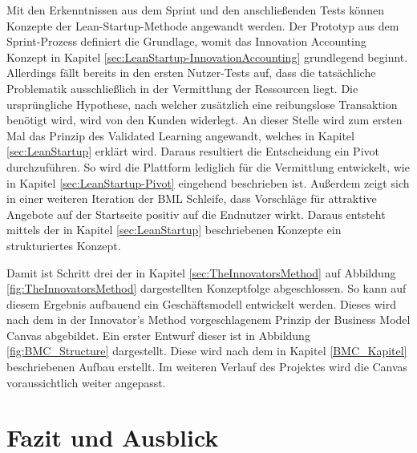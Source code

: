 Mit den Erkenntnissen aus dem Sprint und den anschließenden Tests können Konzepte der Lean-Startup-Methode angewandt werden. Der Prototyp aus dem Sprint-Prozess definiert die Grundlage, womit das Innovation Accounting Konzept in Kapitel \ref{sec:LeanStartup-InnovationAccounting} grundlegend beginnt. Allerdings fällt bereits in den ersten Nutzer-Tests auf, dass die tatsächliche Problematik ausschließlich in der Vermittlung der Ressourcen liegt. Die ursprüngliche Hypothese, nach welcher zusätzlich eine reibungslose Transaktion benötigt wird, wird von den Kunden widerlegt. An dieser Stelle wird zum ersten Mal das Prinzip des Validated Learning angewandt, welches in Kapitel \ref{sec:LeanStartup} erklärt wird. Daraus resultiert die Entscheidung ein Pivot durchzuführen. So wird die Plattform lediglich für die Vermittlung entwickelt, wie in Kapitel \ref{sec:LeanStartup-Pivot} eingehend beschrieben ist. Außerdem zeigt sich in einer weiteren Iteration der \ac{BML} Schleife, dass Vorschläge für attraktive Angebote auf der Startseite positiv auf die Endnutzer wirkt. Daraus entsteht mittels der in Kapitel \ref{sec:LeanStartup} beschriebenen Konzepte ein strukturiertes Konzept. 

Damit ist Schritt drei der in Kapitel \ref{sec:TheInnovatorsMethod} auf Abbildung \ref{fig:TheInnovatorsMethod} dargestellten Konzeptfolge abgeschlossen. So kann auf diesem Ergebnis aufbauend ein Geschäftsmodell entwickelt werden. Dieses wird nach dem in der Innovator's Method vorgeschlagenem Prinzip der Business Model Canvas abgebildet. Ein erster Entwurf dieser ist in Abbildung \ref{fig:BMC_Structure} dargestellt. Diese wird nach dem in Kapitel \ref{BMC_Kapitel} beschriebenen Aufbau erstellt. Im weiteren Verlauf des Projektes wird die Canvas voraussichtlich weiter angepasst.

\section{Fazit und Ausblick}

